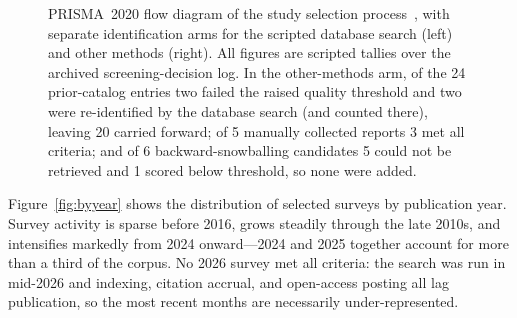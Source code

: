 \documentclass[a4paper,fleqn]{cas-sc}
\begin{document}
\begin{figure}[H]
{%
}
\caption{PRISMA~2020 flow diagram of the study selection process~\cite{Page2021PRISMA}, with separate identification arms for the scripted database search (left) and other methods (right). All figures are scripted tallies over the archived screening-decision log. In the other-methods arm, of the 24 prior-catalog entries two failed the raised quality threshold and two were re-identified by the database search (and counted there), leaving 20 carried forward; of 5 manually collected reports 3 met all criteria; and of 6 backward-snowballing candidates 5 could not be retrieved and 1 scored below threshold, so none were added.}
\label{fig:prisma}
\end{figure}

Figure~\ref{fig:byyear} shows the distribution of selected surveys by publication year. Survey activity is sparse before 2016, grows steadily through the late 2010s, and intensifies markedly from 2024 onward---2024 and 2025 together account for more than a third of the corpus. No 2026 survey met all criteria: the search was run in mid-2026 and indexing, citation accrual, and open-access posting all lag publication, so the most recent months are necessarily under-represented.
\end{document}

